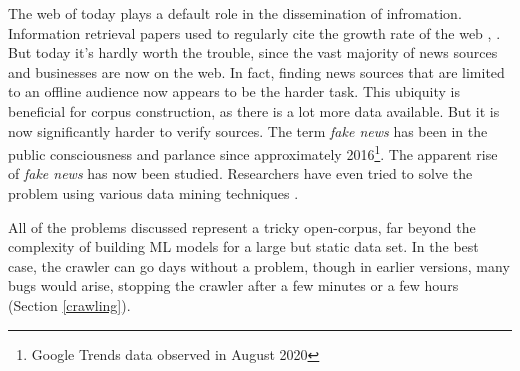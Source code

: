 The web of today plays a default role in the dissemination of infromation.
Information retrieval papers used to regularly cite the growth rate of the
web \cite{page1998}, \cite{mcbryan1994}. But today it's hardly worth the
trouble, since the vast majority of news sources and businesses are now on the
web.  In fact, finding news sources that are limited to an offline
audience now appears to be the harder task.  This ubiquity
is beneficial for corpus construction, as there is a lot more
data available.  But it is now significantly harder to verify
sources.  The term {\it fake news} has been in the public consciousness
and parlance since approximately 2016\footnote{Google
Trends data observed in August 2020}.  The apparent rise of
{\it fake news} has now been studied.  Researchers have even
tried to solve the problem using various data mining
techniques \cite{shu2017}.

All of the problems discussed represent a tricky open-corpus,
far beyond the complexity of building ML models for a large but
static data set.  In the best case, the \nr{} crawler can go days
without a problem, though in earlier versions, many bugs would
arise, stopping the crawler after a few minutes or a few hours
(Section \ref{crawling}).